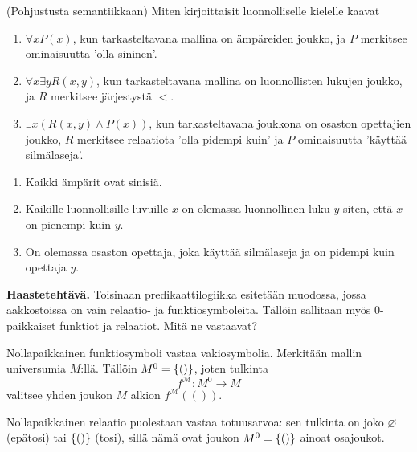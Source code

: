 \documentclass[11pt,a4paper]{amsart}
\begin{document}
\begin{exercise}
  (Pohjustusta semantiikkaan) Miten kirjoittaisit luonnolliselle kielelle kaavat
  \begin{enumerate}[label=(\alph*)]
    \item \(\forall x P(x)\), kun tarkasteltavana mallina on ämpäreiden joukko,
      ja \(P\) merkitsee ominaisuutta 'olla sininen'.
    \item \(\forall x\exists y R(x,y)\), kun tarkasteltavana mallina on
      luonnollisten lukujen joukko, ja \(R\) merkitsee järjestystä \(<\).
    \item \(\exists x(R(x,y) \land P(x))\), kun tarkasteltavana joukkona on
      osaston opettajien joukko, \(R\) merkitsee relaatiota 'olla pidempi kuin'
      ja \(P\) ominaisuutta 'käyttää silmälaseja'.
  \end{enumerate}
\end{exercise}

\begin{solution}
  \leavevmode\par
  \begin{enumerate}[label=(\alph*)]
    \item Kaikki ämpärit ovat sinisiä.
    \item Kaikille luonnollisille luvuille \(x\) on olemassa luonnollinen
      luku \(y\) siten, että \(x\) on pienempi kuin \(y\).
    \item On olemassa osaston opettaja, joka käyttää silmälaseja ja on
      pidempi kuin opettaja \(y\).
  \end{enumerate}
\end{solution}

\noindent\textbf{Haastetehtävä.} Toisinaan predikaattilogiikka
esitetään muodossa,
jossa aakkostoissa on vain relaatio- ja funktiosymboleita. Tällöin
sallitaan myös
0-paikkaiset funktiot ja relaatiot. Mitä ne vastaavat?

\begin{solution}
  Nollapaikkainen funktiosymboli vastaa vakiosymbolia. Merkitään mallin
  universumia \(M\):llä. Tällöin \(M^0 = \left\lbrace()\right\rbrace\), joten tulkinta
  \[
    f^{\mathcal{M}} \colon M^0 \to M
  \]
  valitsee yhden joukon \(M\) alkion \(f^{\mathcal{M}}(())\).

  Nollapaikkainen relaatio puolestaan vastaa totuusarvoa: sen tulkinta on
  joko \(\varnothing\) (epätosi) tai \(\left\lbrace()\right\rbrace\) (tosi), sillä nämä ovat
  joukon \(M^0 = \left\lbrace()\right\rbrace\) ainoat osajoukot.
\end{solution}
\end{document}
